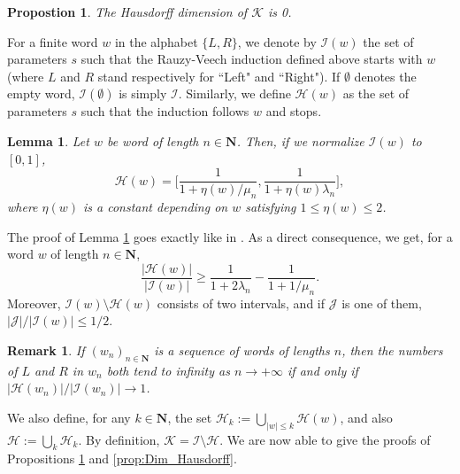 \documentclass[11pt]{article}
\newtheorem{lemma}[thm]{Lemma}
\newtheorem{prop}[thm]{Propostion}
\newtheorem*{rmk}{Remark}
\begin{document}
\begin{prop}
\label{prop:Dim_Hausdorff_modele}
    The Hausdorff dimension of $\mathcal{K}$ is 0.
\end{prop}

For a finite word $w$ in the alphabet $\{L,R\}$, we denote by $\mathcal{I}(w)$ the set of parameters $s$ such that the Rauzy-Veech induction defined above starts with $w$ (where $L$ and $R$ stand respectively for ``Left" and ``Right"). If $\emptyset$ denotes the empty word, $\mathcal{I}(\emptyset)$ is simply $\mathcal{I}$. Similarly, we define $\mathcal{H}(w)$ as the set of parameters $s$ such that the induction follows $w$ and stops.

\begin{lemma}
\label{lemma:Taille_trou_renorm}
    Let $w$ be word of length $n\in\mathbf{N}$. Then, if we normalize $\mathcal{I}(w)$ to $[0,1]$,
    \[
     \mathcal{H}(w)=\biggl[\frac{1}{1+\eta(w)/\mu_{n}},\frac{1}{1+\eta(w)\lambda_{n}}\biggr],
    \]
    where $\eta(w)$ is a constant depending on $w$ satisfying $1\leq\eta(w)\leq2$.
\end{lemma}

The proof of Lemma \ref{lemma:Taille_trou_renorm} goes exactly like in \cite{BoulangerFougeronGhazouani}. As a direct consequence, we get, for a word $w$ of length $n\in\mathbf{N}$,
\begin{equation}
\label{eq:proporI/H}
\frac{\lvert\mathcal{H}(w)\rvert}{\lvert\mathcal{I}(w)\rvert}\geq\frac{1}{1+2\lambda_{n}}-\frac{1}{1+1/\mu_{n}}.
\end{equation}
Moreover, $\mathcal{I}(w)\setminus \mathcal{H}(w)$ consists of two intervals, and if $\mathcal{J}$ is one of them, $\lvert\mathcal{J}\rvert/\lvert\mathcal{I}(w)\rvert\leq1/2$.

\begin{rmk}
    If $(w_{n})_{n\in\mathbf{N}}$ is a sequence of words of lengths $n$, then the numbers of $L$ and $R$ in $w_{n}$ both tend to infinity as $n\rightarrow+\infty$ if and only if $\lvert\mathcal{H}(w_{n})\rvert/\lvert\mathcal{I}(w_{n})\rvert\rightarrow1$.
\end{rmk}

We also define, for any $k\in\mathbf{N}$, the set $\mathcal{H}_{k}:=\bigcup_{\lvert w\rvert\leq k}\mathcal{H}(w)$, and also $\mathcal{H}:=\bigcup_{k}\mathcal{H}_{k}$. By definition, $\mathcal{K}=\mathcal{I}\setminus\mathcal{H}$. We are now able to give the proofs of Propositions \ref{prop:Dim_Hausdorff_modele} and \ref{prop:Dim_Hausdorff}.
\end{document}
